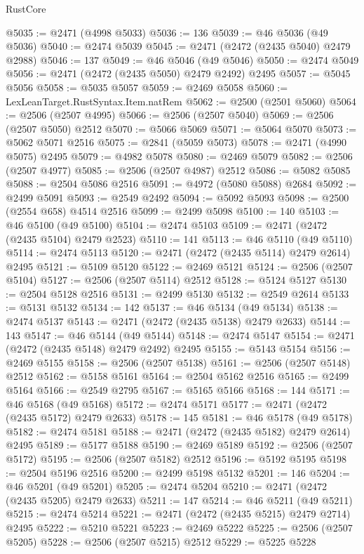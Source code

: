 \begin{lexlean}{RustCore}
\begin{coremodule}
@5035 := @2471 (@4998 @5033)
@5036 := 136
@5039 := @46 @5036 (@49 @5036)
@5040 := @2474 @5039
@5045 := @2471 (@2472 (@2435 @5040) @2479 @2988)
@5046 := 137
@5049 := @46 @5046 (@49 @5046)
@5050 := @2474 @5049
@5056 := @2471 (@2472 (@2435 @5050) @2479 @2492) @2495
@5057 := @5045 @5056
@5058 := @5035 @5057
@5059 := @2469 @5058
@5060 := LexLeanTarget.RustSyntax.Item.natRem
@5062 := @2500 (@2501 @5060)
@5064 := @2506 (@2507 @4995)
@5066 := @2506 (@2507 @5040)
@5069 := @2506 (@2507 @5050) @2512
@5070 := @5066 @5069
@5071 := @5064 @5070
@5073 := @5062 @5071 @2516
@5075 := @2841 (@5059 @5073)
@5078 := @2471 (@4990 @5075) @2495
@5079 := @4982 @5078
@5080 := @2469 @5079
@5082 := @2506 (@2507 @4977)
@5085 := @2506 (@2507 @4987) @2512
@5086 := @5082 @5085
@5088 := @2504 @5086 @2516
@5091 := @4972 (@5080 @5088) @2684
@5092 := @2499 @5091
@5093 := @2549 @2492
@5094 := @5092 @5093
@5098 := @2500 (@2554 @658) @4514 @2516
@5099 := @2499 @5098
@5100 := 140
@5103 := @46 @5100 (@49 @5100)
@5104 := @2474 @5103
@5109 := @2471 (@2472 (@2435 @5104) @2479 @2523)
@5110 := 141
@5113 := @46 @5110 (@49 @5110)
@5114 := @2474 @5113
@5120 := @2471 (@2472 (@2435 @5114) @2479 @2614) @2495
@5121 := @5109 @5120
@5122 := @2469 @5121
@5124 := @2506 (@2507 @5104)
@5127 := @2506 (@2507 @5114) @2512
@5128 := @5124 @5127
@5130 := @2504 @5128 @2516
@5131 := @2499 @5130
@5132 := @2549 @2614
@5133 := @5131 @5132
@5134 := 142
@5137 := @46 @5134 (@49 @5134)
@5138 := @2474 @5137
@5143 := @2471 (@2472 (@2435 @5138) @2479 @2633)
@5144 := 143
@5147 := @46 @5144 (@49 @5144)
@5148 := @2474 @5147
@5154 := @2471 (@2472 (@2435 @5148) @2479 @2492) @2495
@5155 := @5143 @5154
@5156 := @2469 @5155
@5158 := @2506 (@2507 @5138)
@5161 := @2506 (@2507 @5148) @2512
@5162 := @5158 @5161
@5164 := @2504 @5162 @2516
@5165 := @2499 @5164
@5166 := @2549 @2795
@5167 := @5165 @5166
@5168 := 144
@5171 := @46 @5168 (@49 @5168)
@5172 := @2474 @5171
@5177 := @2471 (@2472 (@2435 @5172) @2479 @2633)
@5178 := 145
@5181 := @46 @5178 (@49 @5178)
@5182 := @2474 @5181
@5188 := @2471 (@2472 (@2435 @5182) @2479 @2614) @2495
@5189 := @5177 @5188
@5190 := @2469 @5189
@5192 := @2506 (@2507 @5172)
@5195 := @2506 (@2507 @5182) @2512
@5196 := @5192 @5195
@5198 := @2504 @5196 @2516
@5200 := @2499 @5198 @5132
@5201 := 146
@5204 := @46 @5201 (@49 @5201)
@5205 := @2474 @5204
@5210 := @2471 (@2472 (@2435 @5205) @2479 @2633)
@5211 := 147
@5214 := @46 @5211 (@49 @5211)
@5215 := @2474 @5214
@5221 := @2471 (@2472 (@2435 @5215) @2479 @2714) @2495
@5222 := @5210 @5221
@5223 := @2469 @5222
@5225 := @2506 (@2507 @5205)
@5228 := @2506 (@2507 @5215) @2512
@5229 := @5225 @5228

\end{coremodule}
\end{lexlean}
